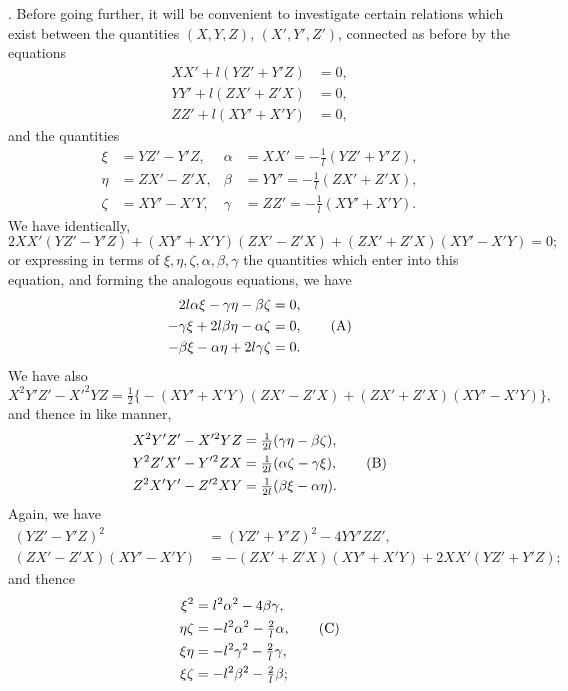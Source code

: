 \documentclass[11pt]{article}
\begin{document}
\medskip

. Before going further, it will be convenient to investigate certain relations which exist between the quantities $(X, Y, Z)$, $(X', Y', Z')$, connected as before by the equations
\begin{align*}
X X' + l(Y Z' + Y' Z) &= 0, \\
Y Y' + l(Z X' + Z' X) &= 0, \\
Z Z' + l(X Y' + X' Y) &= 0,
\end{align*}
and the quantities
\begin{align*}
\xi  &= Y Z' - Y' Z, & \alpha &= X X' = -\tfrac{1}{l}(Y Z' + Y' Z), \\
\eta &= Z X' - Z' X, & \beta  &= Y Y' = -\tfrac{1}{l}(Z X' + Z' X), \\
\zeta&= X Y' - X' Y, & \gamma &= Z Z' = -\tfrac{1}{l}(X Y' + X' Y).
\end{align*}
We have identically,
\[
2 X X' (Y Z' - Y' Z) + (X Y' + X' Y)(Z X' - Z' X) + (Z X' + Z' X)(X Y' - X' Y) = 0;
\]
or expressing in terms of $\xi, \eta, \zeta, \alpha, \beta, \gamma$ the quantities which enter into this equation, and forming the analogous equations, we have
\begin{align}
2 l \alpha \xi - \gamma \eta - \beta \zeta &= 0, \notag \\
-\gamma \xi + 2 l \beta \eta - \alpha \zeta &= 0, \tag{A}\\
-\beta \xi - \alpha \eta + 2 l \gamma \zeta &= 0. \notag
\end{align}
We have also
\[
X^2 Y' Z' - X'^2 Y Z = \tfrac{1}{2}\bigl\{-(X Y' + X' Y)(Z X' - Z' X) + (Z X' + Z' X)(X Y' - X' Y)\bigr\},
\]
and thence in like manner,
\begin{align}
X^2 Y' Z' - X'^2 Y Z &= \tfrac{1}{2 l}(\gamma \eta - \beta \zeta), \notag \\
Y^2 Z' X' - Y'^2 Z X &= \tfrac{1}{2 l}(\alpha \zeta - \gamma \xi), \tag{B}\\
Z^2 X' Y' - Z'^2 X Y &= \tfrac{1}{2 l}(\beta \xi - \alpha \eta). \notag
\end{align}
Again, we have
\begin{align*}
(Y Z' - Y' Z)^2 &= (Y Z' + Y' Z)^2 - 4 Y Y' Z Z', \\
(Z X' - Z' X)(X Y' - X' Y) &= -(Z X' + Z' X)(X Y' + X' Y) + 2 X X' (Y Z' + Y' Z);
\end{align*}
and thence
\begin{align}
\xi^2 &= l^2 \alpha^2 - 4 \beta \gamma, \notag \\
\eta\zeta &= -l^2 \alpha^2 - \tfrac{2}{l}\alpha, \tag{C}\\
\xi\eta &= -l^2 \gamma^2 - \tfrac{2}{l}\gamma, \notag \\
\xi\zeta &= -l^2 \beta^2 - \tfrac{2}{l}\beta;
\end{align}
\end{document}
